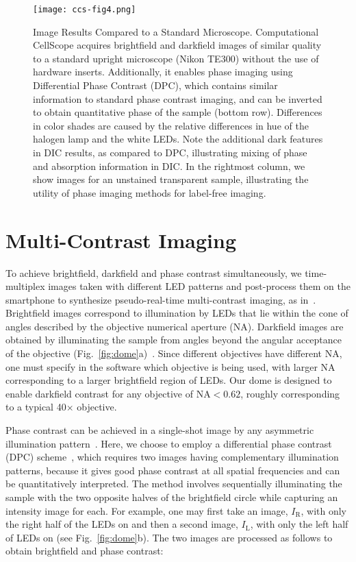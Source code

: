 \begin{figure}
\begin{center}
\texttt{[image: ccs-fig4.png]}
\end{center}
\caption {{Image Results Compared to a Standard Microscope.} Computational CellScope acquires brightfield and darkfield images of similar quality to a standard upright microscope (Nikon TE300) without the use of hardware inserts. Additionally, it enables phase imaging using Differential Phase Contrast (DPC), which contains similar information to standard phase contrast imaging, and can be inverted to obtain quantitative phase of the sample (bottom row). Differences in color shades are caused by the relative differences in hue of the halogen lamp and the white LEDs. Note the additional dark features in DIC results, as compared to DPC, illustrating mixing of phase and absorption information in DIC. In the rightmost column, we show images for an unstained transparent sample, illustrating the utility of phase imaging methods for label-free imaging.
}
\label{fig:contrastcomparison}
\end{figure} 


\section{Multi-Contrast Imaging}

To achieve brightfield, darkfield and phase contrast simultaneously, we time-multiplex images taken with different LED patterns and post-process them on the smartphone to synthesize pseudo-real-time multi-contrast imaging, as in~\cite{zijiMulti}. Brightfield images correspond to illumination by LEDs that lie within the cone of angles described by the objective numerical aperture (NA). Darkfield images are obtained by illuminating the sample from angles beyond the angular acceptance of the objective (Fig.~\ref{fig:dome}a)~\cite{Zheng2011}. Since different objectives have different NA, one must specify in the software which objective is being used, with larger NA corresponding to a larger brightfield region of LEDs. Our dome is designed to enable darkfield contrast for any objective of NA$<0.62$, roughly corresponding to a typical 40$\times$ objective.

Phase contrast can be achieved in a single-shot image by any asymmetric illumination pattern~\cite{kachar1985asymmetric,Dodt01101999}. Here, we choose to employ a differential phase contrast (DPC) scheme~\cite{Hamilton1984a,mehta2009quantitative,Tian14,ford2012phase}, which requires two images having complementary illumination patterns, because it gives good phase contrast at all spatial frequencies and can be quantitatively interpreted. The method involves sequentially illuminating the sample with the two opposite halves of the brightfield circle while capturing an intensity image for each. For example, one may first take an image, $I_\mathrm{R}$, with only the right half of the LEDs on and then a second image, $I_\mathrm{L}$, with only the left half of LEDs on (see Fig.~\ref{fig:dome}b). The two images are processed as follows to obtain brightfield and phase contrast:

